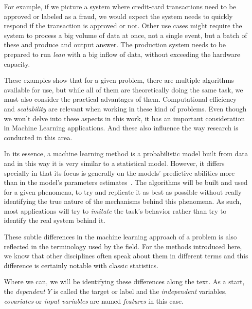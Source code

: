 For example, if we picture a system where credit-card transactions need to be approved or labeled as a fraud, we would expect the system needs to quickly respond if the transaction is approved or not.
Other use cases might require the system to process a big volume of data at once, not a single event, but a batch of these and produce and output answer.
The production system needs to be prepared to run \textit{lean} with a big inflow of data, without exceeding the hardware capacity.

These examples show that for a given problem, there are multiple algorithms available for use, but while all of them are theoretically doing the same task, we must also consider the practical advantages of them.
Computational efficiency and \textit{scalability} are relevant when working in these kind of problems.
Even though we won't delve into these aspects in this work, it has an important consideration in Machine Learning applications.
And these also influence the way research is conducted in this area.


In its essence, a machine learning method is a probabilistic model built from data and in this way it is very similar to a statistical model.
However, it differs specially in that its focus is generally on the models' predictive abilities more than in the model's parameters estimates~\citep{breiman-statisticalmodeling}.
The algorithms will be built and used for a given phenomena, to try and replicate it as best as possible without really identifying the true nature of the mechanisms behind this phenomena.
As such, most applications will try to \textit{imitate} the task's behavior rather than try to identify the real system behind it.


These subtle differences in the machine learning approach of a problem is also reflected in the terminology used by the field.
For the methods introduced here, we know that other disciplines often speak about them in different terms and this difference is certainly notable with classic statistics.

Where we can, we will be identifying these differences along the text.
As a start, the \textit{dependent} $Y$ is called the target or label and the \textit{independent} variables, \textit{covariates} or \textit{input variables} are named \textit{features} in this case.

